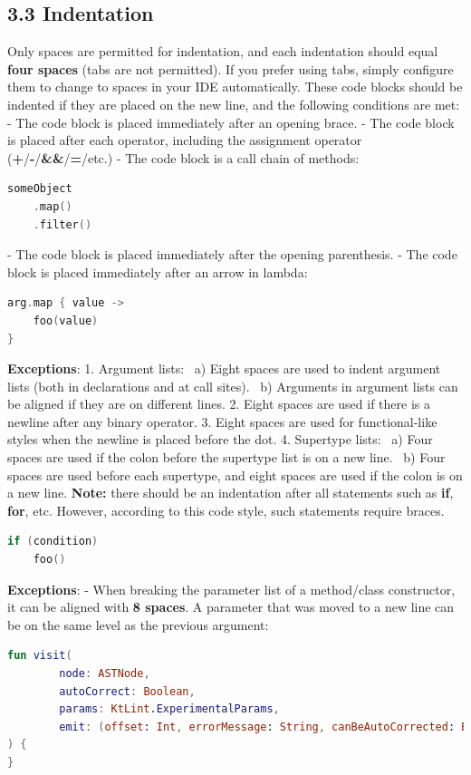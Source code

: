 \subsection*{\textbf{3.3 Indentation}}
\label{sec:3.3}
Only spaces are permitted for indentation, and each indentation should equal \textbf{four spaces} (tabs are not permitted).
If you prefer using tabs, simply configure them to change to spaces in your IDE automatically.
These code blocks should be indented if they are placed on the new line, and the following conditions are met:
-	The code block is placed immediately after an opening brace.
-	The code block is placed after each operator, including the assignment operator (\textbf{+}/\textbf{-}/\textbf{\&\&}/\textbf{=}/etc.)
-	The code block is a call chain of methods:
\begin{lstlisting}[language=Kotlin]
someObject
    .map()
    .filter()
\end{lstlisting}
-  The code block is placed immediately after the opening parenthesis.
-  The code block is placed immediately after an arrow in lambda:
\begin{lstlisting}[language=Kotlin]
arg.map { value ->
    foo(value)
}
\end{lstlisting}
    
\textbf{Exceptions}:
1.	Argument lists: \
a) Eight spaces are used to indent argument lists (both in declarations and at call sites). \
b) Arguments in argument lists can be aligned if they are on different lines. 
2.	Eight spaces are used if there is a newline after any binary operator.
3.	Eight spaces are used for functional-like styles when the newline is placed before the dot.
4.	Supertype lists: \
a) Four spaces are used if the colon before the supertype list is on a new line. \
b) Four spaces are used before each supertype, and eight spaces are used if the colon is on a new line. 
\textbf{Note:} there should be an indentation after all statements such as \textbf{if}, \textbf{for}, etc. However, according to this code style, such statements require braces. 
\begin{lstlisting}[language=Kotlin]
if (condition)
    foo()
\end{lstlisting}
\textbf{Exceptions}: 
- When breaking the parameter list of a method/class constructor, it can be aligned with \textbf{8 spaces}. A parameter that was moved to a new line can be on the same level as the previous argument:
    
\begin{lstlisting}[language=Kotlin]
fun visit(
        node: ASTNode,
        autoCorrect: Boolean,
        params: KtLint.ExperimentalParams,
        emit: (offset: Int, errorMessage: String, canBeAutoCorrected: Boolean) -> Unit
) {   
}
\end{lstlisting}
    

